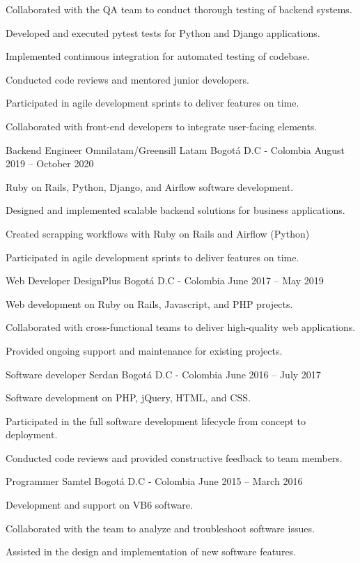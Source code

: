 \documentclass[]{awesome-cv}
\begin{document}
\begin{cventries}
{\begin{cvitems}
		\item {Collaborated with the QA team to conduct thorough testing of backend systems.}
		\item {Developed and executed pytest tests for Python and Django applications.}
		\item {Implemented continuous integration for automated testing of codebase.}
		\item {Conducted code reviews and mentored junior developers.}
		\item {Participated in agile development sprints to deliver features on time.}
		\item {Collaborated with front-end developers to integrate user-facing elements.}
		\end{cvitems}}
	\cventry
	{Backend Engineer}
	{Omnilatam/Greensill Latam}
	{Bogotá D.C - Colombia}
	{August 2019 – October 2020}
	{\begin{cvitems}
		\item {Ruby on Rails, Python, Django, and Airflow software development.}
		\item {Designed and implemented scalable backend solutions for business applications.}
		\item {Created scrapping workflows with Ruby on Rails and Airflow (Python)}
		\item {Participated in agile development sprints to deliver features on time.}
		\end{cvitems}}
	\cventry
	{Web Developer}
	{DesignPlus}
	{Bogotá D.C - Colombia}
	{June 2017 – May 2019}
	{\begin{cvitems}
		\item {Web development on Ruby on Rails, Javascript, and PHP projects.}
		\item {Collaborated with cross-functional teams to deliver high-quality web applications.}
		\item {Provided ongoing support and maintenance for existing projects.}
		\end{cvitems}}
	\cventry
	{Software developer}
	{Serdan}
	{Bogotá D.C - Colombia}
	{June 2016 – July 2017}
	{\begin{cvitems}
		\item {Software development on PHP, jQuery, HTML, and CSS.}
		\item {Participated in the full software development lifecycle from concept to deployment.}
		\item {Conducted code reviews and provided constructive feedback to team members.}
		\end{cvitems}}
	\cventry
	{Programmer}
	{Samtel}
	{Bogotá D.C - Colombia}
	{June 2015 – March 2016}
	{\begin{cvitems}
		\item {Development and support on VB6 software.}
		\item {Collaborated with the team to analyze and troubleshoot software issues.}
		\item {Assisted in the design and implementation of new software features.}
		\end{cvitems}}
\end{cventries}
\end{document}
